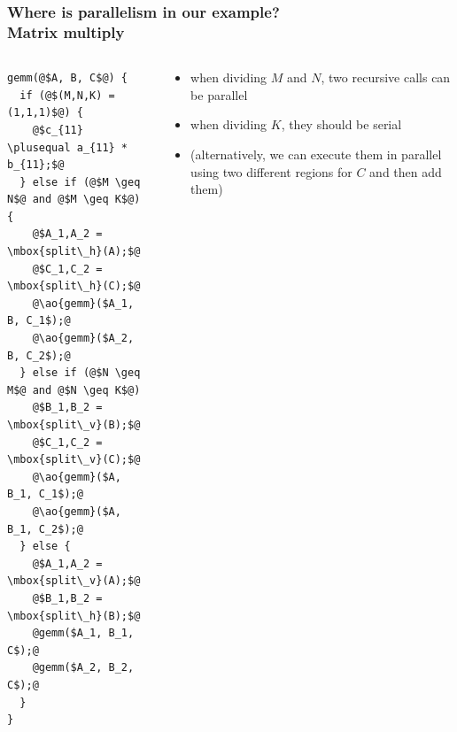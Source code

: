 \documentclass[12pt,dvipdfmx]{beamer}
\newcommand{\plusequal}{\mbox{\tt\ += }}
\newcommand{\ao}[1]{{\color{blue}#1}}
\begin{document}
\begin{frame}[fragile]
\frametitle{Where is parallelism in our example? \\ 
Matrix multiply}

\begin{columns}[t]
\begin{column}{0.5\textwidth}
\begin{lstlisting}[basicstyle=\scriptsize]
gemm(@$A, B, C$@) {
  if (@$(M,N,K) = (1,1,1)$@) {
    @$c_{11} \plusequal a_{11} * b_{11};$@
  } else if (@$M \geq N$@ and @$M \geq K$@) {
    @$A_1,A_2 = \mbox{split\_h}(A);$@
    @$C_1,C_2 = \mbox{split\_h}(C);$@
    @\ao{gemm}($A_1, B, C_1$);@
    @\ao{gemm}($A_2, B, C_2$);@
  } else if (@$N \geq M$@ and @$N \geq K$@)
    @$B_1,B_2 = \mbox{split\_v}(B);$@
    @$C_1,C_2 = \mbox{split\_v}(C);$@
    @\ao{gemm}($A, B_1, C_1$);@
    @\ao{gemm}($A, B_1, C_2$);@
  } else {
    @$A_1,A_2 = \mbox{split\_v}(A);$@
    @$B_1,B_2 = \mbox{split\_h}(B);$@
    @gemm($A_1, B_1, C$);@
    @gemm($A_2, B_2, C$);@
  }
}
\end{lstlisting}
\end{column}

\begin{column}{0.5\textwidth}
  \begin{itemize}
  \item when dividing $M$ and $N$, two recursive calls
    can be parallel
  \item when dividing $K$, they should be serial
  \item {\small 
      (alternatively, we can execute them in parallel
      using two different regions for $C$ and then add them)}
  \end{itemize}
\end{column}  
\end{columns}
\end{frame}

\end{document}

